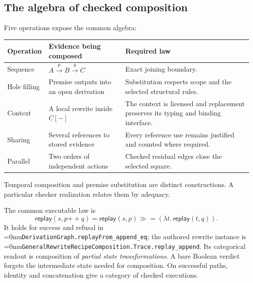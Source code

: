 \documentclass[11pt,a4paper]{article}
\newcommand{\name}[1]{\textup{\Urlmuskip=0mu\relax\nolinkurl{#1}}}
\newcommand{\diagramcaption}[1]{\par{\small\color{ink}#1\par}\medskip}
\begin{document}
\subsection{The algebra of checked composition}

Five operations expose the common algebra:

\begin{tabularx}{\linewidth}{@{}p{25mm}XX@{}}
\toprule
Operation & Evidence being composed & Required law \\
\midrule
Sequence & $A\xrightarrow{p}B\xrightarrow{q}C$ & Exact joining boundary. \\
Hole filling & Premise outputs into an open derivation & Substitution respects scope and the selected structural rules. \\
Context & A local rewrite inside $C[-]$ & The context is licensed and replacement preserves its typing and binding interface. \\
Sharing & Several references to stored evidence & Every reference use remains justified and counted where required. \\
Parallel & Two orders of independent actions & Checked residual edges close the selected square. \\
\bottomrule
\end{tabularx}

\begin{center}
\end{center}
\diagramcaption{Temporal composition and premise substitution are distinct
constructions. A particular checker realization relates them by adequacy.}

The common executable law is
\[
 \mathsf{replay}(s,p\mathbin{+\!+}q)
 =\mathsf{replay}(s,p)\mathbin{\gg\!=}
       (\lambda t.\,\mathsf{replay}(t,q)).
\]
It holds for success and refusal in
\name{DerivationGraph.replayFrom_append_eq}; the authored rewrite instance is
\name{GeneralRewriteRecipeComposition.Trace.replay_append}. Its categorical
readout is composition of \emph{partial state transformations}. A bare Boolean
verdict forgets the intermediate state needed for composition. On successful
paths, identity and concatenation give a category of checked executions.
\end{document}
